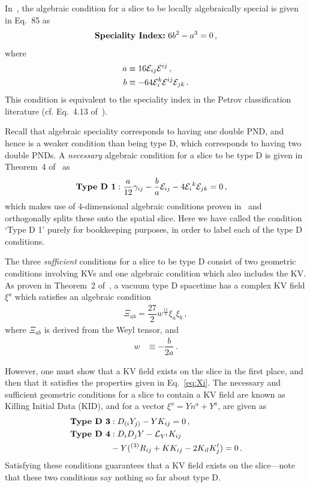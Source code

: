 In~\cite{lobo16}, the algebraic condition for a slice to be locally algebraically special is given in Eq.~85 as 
\begin{align}
\label{eq:Speciality Index} 
\textrm{\textbf{Speciality Index:\;}} 6b^2 - a^3 = 0  \,,
\end{align}
where 
\begin{align}
a &\equiv 16 \mathcal E_{ij}\mathcal E^{ij} \,,  \nonumber  \\ 
b &\equiv -64 \mathcal E_i^k \mathcal E^{ij} \mathcal E_{jk}  \nonumber \,. 
\end{align}
This condition is equivalent to the speciality index in the Petrov classification literature (cf. Eq.~4.13 of~\cite{stephani2009exact}). 

Recall that algebraic speciality corresponds to having one double PND, and hence is a weaker condition than being type D, which corresponds to having two double PNDs. A \textit{necessary} algebraic condition for a slice to be type D is given in Theorem~4 of~\cite{lobo16} as
\begin{align}
\label{eq:typed1}
\textrm{\textbf{Type D 1}}&: \dfrac{a}{12} \gamma_{ij} - \dfrac{b}{a} \mathcal E_{ij} - 4 \mathcal E_i{}^k \mathcal E_{jk} = 0 \,,
\end{align}
which makes use of 4-dimensional algebraic conditions proven in~\cite{Ferrando01} and orthogonally splits these onto the spatial slice. Here we have called the condition `Type D  1' purely for bookkeeping purposes, in order to label each of the type D conditions.

The three \textit{sufficient} conditions for a slice to be type D consist of two geometric conditions involving KVs and one algebraic condition which also includes the KV. As proven in Theorem~2 of~\cite{lobo16}, a vacuum type D spacetime has a complex KV field $\xi^a$ which satisfies an algebraic condition 
\begin{align}
\label{eq:Xi}
\Xi_{ab} = \dfrac{27}{2} w^{\frac{11}{3}} \xi_a \xi_b \,,
\end{align}
where $\Xi_{ab}$ is derived from the Weyl tensor, and 
\begin{align}
w &\equiv -\dfrac{b}{2a} \,.
\end{align}

However, one must show that a KV field exists on the slice in the first place, and then that it satisfies the properties given in Eq.~\eqref{eq:Xi}. The necessary and sufficient geometric conditions for a slice to contain a KV field are known as Killing Initial Data (KID), and for a vector $\xi^a = Yn^a + Y^a$, are given as 
\begin{align}
\label{eq:typed3}
\textrm{\textbf{Type D 3}}&: D_{(i} Y_{j)} - Y K_{ij} = 0 \,, \\ 
\label{eq:typed4}
\textrm{\textbf{Type D 4}}&: D_i D_j Y - \mathcal L_{Y^l} K_{ij} \\
& - Y({}^{(3)}R_{ij} + K K_{ij} - 2 K_{il} K^l_j) = 0 \,. \nonumber  
\end{align}  
Satisfying these conditions guarantees that a KV field exists on the slice---note that these two conditions say nothing so far about type D. 

